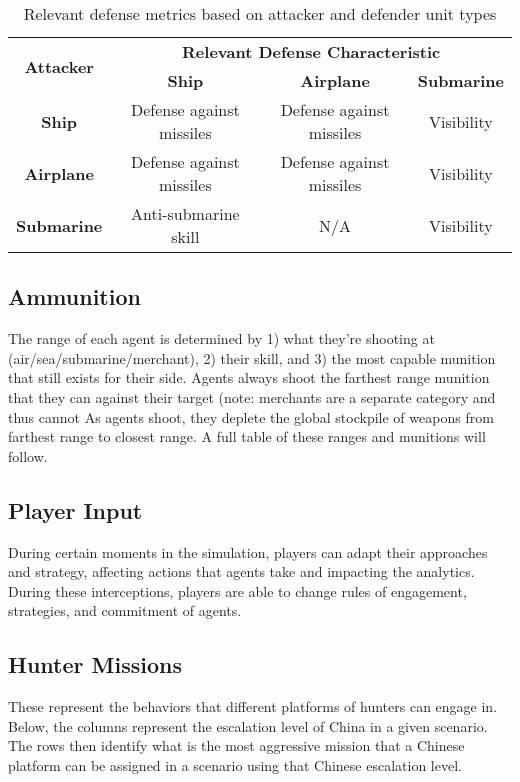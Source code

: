 \documentclass{article}
\begin{document}
\begin{table}[h!]
\centering
\begin{tabular}{|c|c|c|c|}
\hline
\multirow{2}{*}{\textbf{Attacker}} & \multicolumn{3}{c|}{\textbf{Relevant Defense Characteristic}} \\ \cline{2-4}
 & \textbf{Ship} & \textbf{Airplane} & \textbf{Submarine} \\ \hline
\textbf{Ship} & Defense against missiles & Defense against missiles & Visibility \\ \hline
\textbf{Airplane} & Defense against missiles & Defense against missiles & Visibility \\ \hline
\textbf{Submarine} & Anti-submarine skill & N/A & Visibility \\ \hline
\end{tabular}
\caption{Relevant defense metrics based on attacker and defender unit types}
\end{table}

\subsection{Ammunition}

The range of each agent is determined by 1) what they're shooting at (air/sea/submarine/merchant), 2) their skill, and 3) the most capable munition that still exists for their side. Agents always shoot the farthest range munition that they can against their target (note: merchants are a separate category and thus cannot As agents shoot, they deplete the global stockpile of weapons from farthest range to closest range. A full table of these ranges and munitions will follow. 

\subsection{Player Input}
During certain moments in the simulation, players can adapt their approaches and strategy, affecting actions that agents take and impacting the analytics. During these interceptions, players are able to change rules of engagement, strategies, and commitment of agents.

\subsection*{Hunter Missions}

These represent the behaviors that different platforms of hunters can engage in. Below, the columns represent the escalation level of China in a given scenario. The rows then identify what is the most aggressive mission that a Chinese platform can be assigned in a scenario using that Chinese escalation level.
\end{document}
